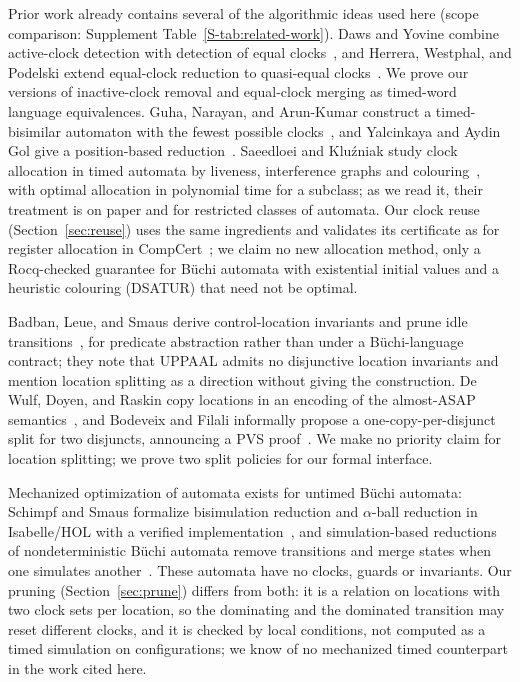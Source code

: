 Prior work already contains several of the algorithmic ideas used here (scope comparison: Supplement Table~\ref{S-tab:related-work}). Daws and Yovine combine active-clock detection with detection of equal clocks~\cite{daws_yovine_rtss1996}, and Herrera, Westphal, and Podelski extend equal-clock reduction to quasi-equal clocks~\cite{herrera_westphal_podelski_tacas2014}.  We prove our versions of inactive-clock removal and equal-clock merging as timed-word language equivalences. Guha, Narayan, and Arun-Kumar construct a timed-bisimilar automaton with the fewest possible clocks~\cite{guha_narayan_arunkumar_concur2014}, and Yalcinkaya and Aydin Gol give a position-based reduction~\cite{yalcinkaya_aydin_gol_formalise2019}. Saeedloei and Kluźniak study clock allocation in timed automata by liveness, interference graphs and colouring~\cite{saeedloei_kluzniak_hscc2018}, with optimal allocation in polynomial time for a subclass; as we read it, their treatment is on paper and for restricted classes of automata. Our clock reuse (Section~\ref{sec:reuse}) uses the same ingredients and validates its certificate as for register allocation in CompCert~\cite{rideau_leroy_cc2010}; we claim no new allocation method, only a Rocq-checked guarantee for B\"uchi automata with existential initial values and a heuristic colouring (DSATUR) that need not be optimal.

Badban, Leue, and Smaus derive control-location invariants and prune idle transitions~\cite{badban_etal_wing2010}, for predicate abstraction rather than under a B\"uchi-language contract; they note that UPPAAL admits no disjunctive location invariants and mention location splitting as a direction without giving the construction. De Wulf, Doyen, and Raskin copy locations in an encoding of the almost-ASAP semantics~\cite{de_wulf_doyen_raskin_fm2005}, and Bodeveix and Filali informally propose a one-copy-per-disjunct split for two disjuncts, announcing a PVS proof~\cite{[BF03]}. We make no priority claim for location splitting; we prove two split policies for our formal interface.

Mechanized optimization of automata exists for untimed B\"uchi automata: Schimpf and Smaus formalize bisimulation reduction and $\alpha$-ball reduction in Isabelle/HOL with a verified implementation~\cite{schimpf_smaus_ila2015}, and simulation-based reductions of nondeterministic B\"uchi automata remove transitions and merge states when one simulates another~\cite{clemente_mayr_lmcs19}. These automata have no clocks, guards or invariants. Our pruning (Section~\ref{sec:prune}) differs from both: it is a relation on locations with two clock sets per location, so the dominating and the dominated transition may reset different clocks, and it is checked by local conditions, not computed as a timed simulation on configurations; we know of no mechanized timed counterpart in the work cited here.

